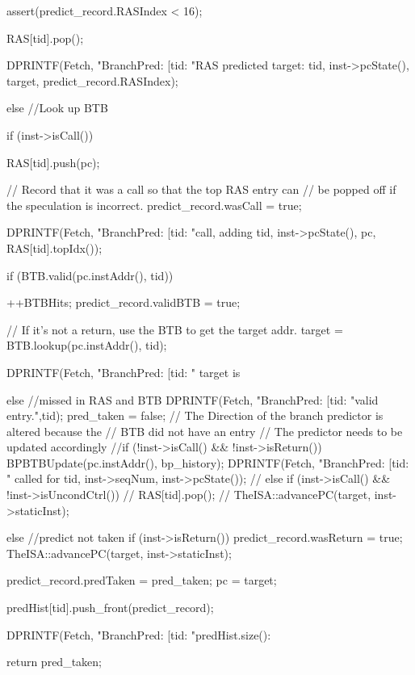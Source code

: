 \begin{DoxyCode}
{{{            assert(predict_record.RASIndex < 16);

            RAS[tid].pop();

            DPRINTF(Fetch, "BranchPred: [tid:%
                    "RAS predicted target: %
                    tid, inst->pcState(), target, predict_record.RASIndex);
        }
        else //Look up BTB
        {
            if (inst->isCall()) {
                RAS[tid].push(pc);

                // Record that it was a call so that the top RAS entry can
                // be popped off if the speculation is incorrect.
                predict_record.wasCall = true;

                DPRINTF(Fetch, "BranchPred: [tid:%
                        "call, adding %
                        tid, inst->pcState(), pc, RAS[tid].topIdx());
            }

            if (BTB.valid(pc.instAddr(), tid)) {
                ++BTBHits;
                predict_record.validBTB = true;

                // If it's not a return, use the BTB to get the target addr.
                target = BTB.lookup(pc.instAddr(), tid);

                DPRINTF(Fetch, "BranchPred: [tid:%
                        " target is %

            } else { //missed in RAS and BTB
                DPRINTF(Fetch, "BranchPred: [tid:%
                        "valid entry.\n",tid);
                pred_taken = false;
                // The Direction of the branch predictor is altered because the
                // BTB did not have an entry
                // The predictor needs to be updated accordingly
              //if (!inst->isCall() && !inst->isReturn()) {
                      BPBTBUpdate(pc.instAddr(), bp_history);
                      DPRINTF(Fetch, "BranchPred: [tid:%
                              " called for %
                              tid, inst->seqNum, inst->pcState());
              //} else if (inst->isCall() && !inst->isUncondCtrl()) {
              //      RAS[tid].pop();
              //}
                TheISA::advancePC(target, inst->staticInst);
            }

        }
    } else { //predict not taken
        if (inst->isReturn()) {
           predict_record.wasReturn = true;
        }
        TheISA::advancePC(target, inst->staticInst);
    }

        predict_record.predTaken = pred_taken;
    pc = target;

    predHist[tid].push_front(predict_record);

    DPRINTF(Fetch, "BranchPred: [tid:%
            "predHist.size(): %

    return pred_taken;
}
\end{DoxyCode}


